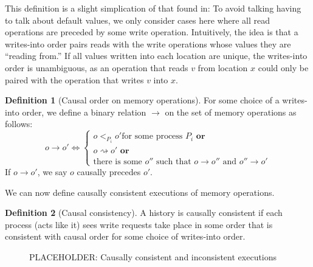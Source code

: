 \documentclass[]             %
{NASA}                       %
\theoremstyle{definition}
\newtheorem{definition}{Definition}[section]
\begin{document}
This definition is a slight simplication of that found
in\citationneeded: To avoid talking having to talk about default
values, we only consider cases here where all read operations are
preceded by some write operation. Intuitively, the idea is that a
writes-into order pairs reads with the write operations whose values
they are ``reading from.'' If all values written into each location
are unique, the writes-into order is unambiguous, as an operation that
reads $v$ from location $x$ could only be paired with the operation
that writes $v$ into $x$.

\begin{definition}[Causal order on memory operations]
  \label{def:memorycausalprecedence}
  For some choice of a writes-into order, we define a binary relation
  $\to$ on the set of memory operations as follows:
  \[o \to o' \iff
  \begin{cases}
    o <_{P_i} o' \textrm{for some process $P_i$}
    \textbf{ or} \\
    o \rightsquigarrow o'
    \textbf{ or} \\
    \textrm{there is some } o'' \textrm{ such that } o \to o'' \textrm{ and } o'' \to o'
  \end{cases}
  \]
  If $o \to o'$, we say $o$ causally precedes $o'$.
\end{definition}

We can now define causally consistent executions of memory operations.

\begin{definition}[Causal consistency]
  \label{def:causalconsistency}
  A history is causally consistent if each process (acts like it) sees
  write requests take place in some order that is consistent with
  causal order for some choice of writes-into order.
\end{definition}

\begin{figure}[p]
  \begin{subfigure}{1\textwidth}
    \centering
    
    \caption{}
    \label{fig:smEx1L1}
  \end{subfigure}

  \begin{subfigure}{1\textwidth}
    
    \caption{}
    \label{fig:smEx5}
  \end{subfigure}

  \caption{PLACEHOLDER: Causally consistent and inconsistent executions}
  \label{fig:smEx3}
\end{figure}
\end{document}
